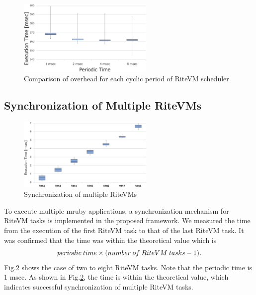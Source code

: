 \documentclass[S,R,E]{article/compsoft}
\begin{document}
{\begin{figure}[t]
    \centering
    \includegraphics[width=6.5cm,clip]{figure/comparison_msec.eps}
\caption{Comparison of overhead for each cyclic period of RiteVM scheduler}
\label{fig:comparison_msec}
\end{figure}


\subsection{Synchronization of Multiple RiteVMs}

 \begin{figure}[t]
    \centering
    \includegraphics[width=6.5cm,clip]{figure/eval_synchronization.eps}
\caption{Synchronization of multiple RiteVMs}
\label{fig:eval_synchronization}
\end{figure}

To execute multiple mruby applications, a synchronization mechanism for RiteVM tasks is implemented in the proposed framework.
We measured the time from the execution of the first RiteVM task to that of the last RiteVM task.
It was confirmed that the time was within the theoretical value which is 
\begin{displaymath}
    {\scriptsize periodic\ time \times (number\ of\ RiteVM\ tasks - 1).}
\end{displaymath}
Fig.\ref{fig:eval_synchronization} shows the case of two to eight RiteVM tasks.
Note that the periodic time is 1 msec.
As shown in Fig.\ref{fig:eval_synchronization}, the time is within the theoretical value, which indicates successful synchronization of multiple RiteVM tasks.




}
\end{document}
